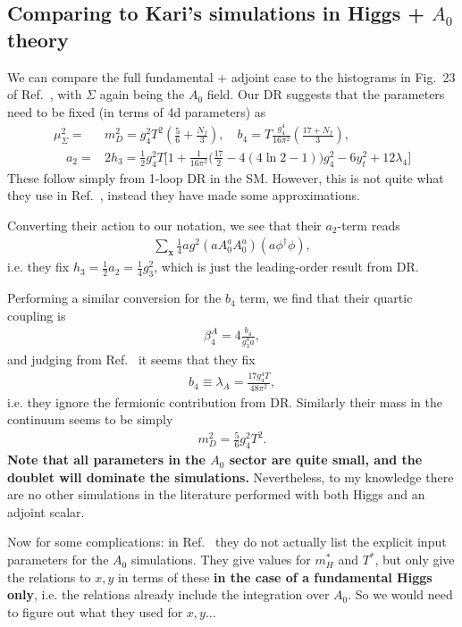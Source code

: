\documentclass[11pt,a4paper]{article}
\begin{document}
\subsection{Comparing to Kari's simulations in Higgs + $A_0$ theory}

We can compare the full fundamental + adjoint case to the histograms in Fig.~23 of Ref.~\cite{Kajantie:1995kf}, with $\Sigma$ again being the $A_0$ field. Our DR suggests that the parameters need to be fixed (in terms of 4d parameters) as 
\begin{align}
\mu^2_\Sigma =& m^2_D = g_4^2 T^2 \left( \frac{5}{6} + \frac{N_f}{3} \right) , \quad b_4 = T \frac{g_4^4}{16\pi^2} \left( \frac{17+N_f}{3} \right), \nonumber \\
\quad a_2 =& 2 h_3 = \frac12 g^2_4 T \Big[ 1 + \frac{1}{16\pi^2} \Big( \frac{17}{2} - 4 (4 \ln 2 -1 ) \Big)g_4^2 - 6 y_t^2 + 12\lambda_4 \Big]
\end{align}
These follow simply from 1-loop DR in the SM. However, this is not quite what they use in Ref.~\cite{Kajantie:1995kf}, instead they have made some approximations.

Converting their action to our notation, we see that their $a_2$-term reads 
\begin{align}
\sum_{\textbf{x}} \frac14 a g^2 (a A^a_0 A^a_0) (a \phi^\dagger\phi),
\end{align}
i.e. they fix $h_3 = \frac12 a_2 = \frac14 g_3^2$, which is just the leading-order result from DR.

Performing a similar conversion for the $b_4$ term, we find that their quartic coupling is
\begin{align*}
\beta^A_4 = 4 \frac{b_4}{g^4_3 a},
\end{align*}
and judging from Ref.~\cite{Farakos:1994kx} it seems that they fix 
\begin{align}
b_4 \equiv \lambda_A = \frac{17 g_4^4 T}{48\pi^2},
\end{align}
i.e. they ignore the fermionic contribution from DR. Similarly their mass in the continuum seems to be simply 
\begin{align}
m^2_D = \frac56 g^2_4 T^2. 
\end{align}
\textbf{Note that all parameters in the $A_0$ sector are quite small, and the doublet will dominate the simulations.} Nevertheless, to my knowledge there are no other simulations in the literature performed with both Higgs and an adjoint scalar.

Now for some complications: in Ref.~\cite{Kajantie:1995kf} they do not actually list the explicit input parameters for the $A_0$ simulations. They give values for $m^*_H$ and $T^*$, but only give the relations to $x,y$ in terms of these \textbf{in the case of a fundamental Higgs only}, i.e. the relations already include the integration over $A_0$. So we would need to figure out what they used for $x,y$... 
\end{document}

